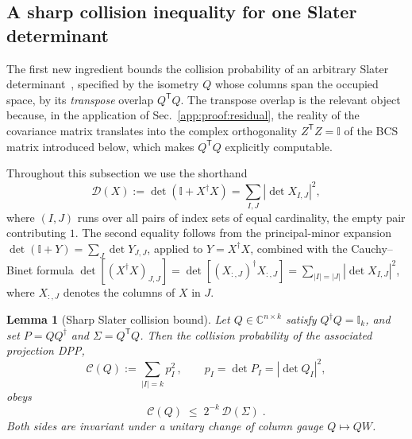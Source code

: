 \documentclass[aps,prl,twocolumn,superscriptaddress,reprint,longbibliography,nofootinbib]{revtex4-2}
\newtheorem{lemma}{Lemma}
\newcommand{\trans}{\mathsf{T}}
\begin{document}
\subsection{A sharp collision inequality for one Slater determinant}
\label{app:proof:slater}

The first new ingredient bounds the collision probability of an arbitrary Slater determinant~\cite{Mbeng2024,surace}, specified by the isometry $Q$ whose columns span the occupied space, by its \emph{transpose} overlap $Q^{\trans}Q$. The transpose overlap is the relevant object because, in the application of Sec.~\ref{app:proof:residual}, the reality of the covariance matrix translates into the complex orthogonality $Z^{\trans}Z=\mathbb{I}$ of the BCS matrix introduced below, which makes $Q^{\trans}Q$ explicitly computable.

Throughout this subsection we use the shorthand
\begin{equation}
    \mathcal{D}(X):=\det\!\left(\mathbb{I}+X^\dagger X\right)
    =\sum_{I,J}\left|\det X_{I,J}\right|^2 ,
    \label{eq:Dfunctional}
\end{equation}
where $(I,J)$ runs over all pairs of index sets of equal cardinality, the empty pair contributing $1$. The second equality follows from the principal-minor expansion $\det(\mathbb{I}+Y)=\sum_J\det Y_{J,J}$, applied to $Y=X^\dagger X$, combined with the Cauchy--Binet formula $\det[(X^\dagger X)_{J,J}]=\det[(X_{:,J})^\dagger X_{:,J}]=\sum_{|I|=|J|}|\det X_{I,J}|^2$, where $X_{:,J}$ denotes the columns of $X$ in $J$.

\begin{lemma}[Sharp Slater collision bound]
\label{lem:Slater-bound}
Let $Q\in\mathbb{C}^{n\times k}$ satisfy $Q^\dagger Q=\mathbb{I}_k$, and set $P=QQ^\dagger$ and $\Sigma=Q^{\trans}Q$. Then the collision probability of the associated projection DPP,
\begin{equation}
    \mathcal{C}(Q):=\sum_{|I|=k}p_I^2\,,
    \qquad p_I=\det P_I=\left|\det Q_I\right|^2 ,
\end{equation}
obeys
\begin{equation}
    \mathcal{C}(Q)\;\le\;2^{-k}\,\mathcal{D}(\Sigma)\;.
    \label{eq:Slater-bound}
\end{equation}
Both sides are invariant under a unitary change of column gauge $Q\mapsto QW$.
\end{lemma}
\end{document}
